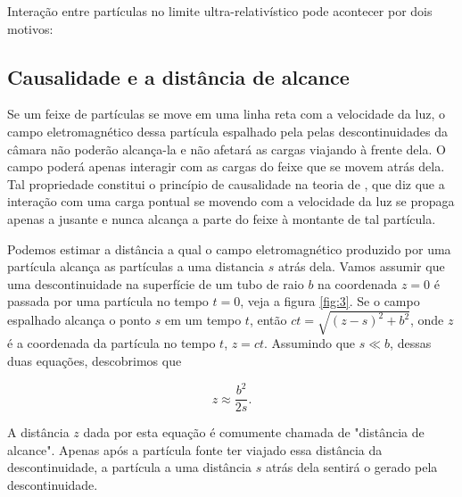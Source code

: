 Interação entre partículas no limite ultra-relativístico pode acontecer por dois motivos:

\subsection{Causalidade e a distância de alcance}

Se um feixe de partículas se move em uma linha reta com a velocidade da luz, o campo eletromagnético dessa partícula espalhado pela pelas descontinuidades da câmara não poderão alcança-la e não afetará as cargas viajando à frente dela. O campo poderá apenas interagir com as cargas do feixe que se movem atrás dela. Tal propriedade constitui o princípio de causalidade na teoria de , que diz que a interação com uma carga pontual se movendo com a velocidade da luz se propaga apenas a jusante e nunca alcança a parte do feixe à montante de tal partícula.

Podemos estimar a distância a qual o campo eletromagnético produzido por uma partícula alcança as partículas a uma distancia $s$ atrás dela. Vamos assumir que uma descontinuidade na superfície de um tubo de raio $b$ na coordenada $z=0$ é passada por uma partícula no tempo $t=0$, veja a figura \ref{fig:3}. Se o campo espalhado alcança o ponto $s$ em um tempo $t$, então $ct = \sqrt{(z-s)^2 + b^2}$, onde $z$ é a coordenada da partícula no tempo $t$, $z=ct$. Assumindo que $s \ll b$, dessas duas equações, descobrimos que

\begin{equation}
    z \approx \frac{b^2}{2s}.
\end{equation}

A distância $z$ dada por esta equação é comumente chamada de "distância de alcance". Apenas após a partícula fonte ter viajado essa distância da descontinuidade, a partícula a uma distância $s$ atrás dela sentirá o  gerado pela descontinuidade.

